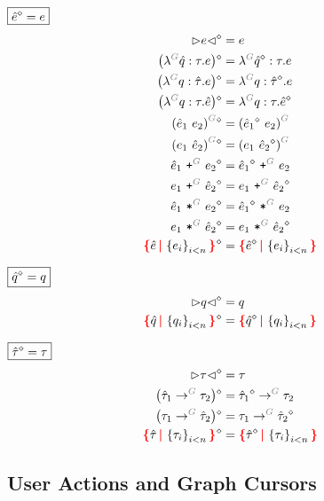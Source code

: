 \noindent $\boxed{\hat{e}\mathclose{}^{\diamond}\mathclose{} = e}$
%
\begin{align*}
  \erase{\cursor{e}} &= e \\
  \erase{\left(\eFun{G}{\Z{q}}{\tau}{e}\right)} &= \eFun{G}{\erase{\Z{q}}}{\tau}{e} \\
  \erase{\left(\eFun{G}{q}{\Z{\tau}}{e}\right)} &= \eFun{G}{q}{\erase{\Z{\tau}}}{e} \\
  \erase{\left(\eFun{G}{q}{\tau}{\Z{e}}\right)} &= \eFun{G}{q}{\tau}{\erase{\Z{e}}} \\
  \erase{\eApp{G}{\Z{e}_1}{e_2}} &= \eApp{G}{\erase{\Z{e}_1}}{e_2} \\
  \erase{\eApp{G}{e_1}{\Z{e}_2}} &= \eApp{G}{e_1}{\erase{\Z{e}_2}} \\
  \erase{\ePlus{G}{\Z{e}_1}{e_2}} &= \ePlus{G}{\erase{\Z{e}_1}}{e_2} \\
  \erase{\ePlus{G}{e_1}{\Z{e}_2}} &= \ePlus{G}{e_1}{\erase{\Z{e}_2}} \\
  \erase{\eTimes{G}{\Z{e}_1}{e_2}} &= \eTimes{G}{\erase{\Z{e}_1}}{e_2} \\
  \erase{\eTimes{G}{e_1}{\Z{e}_2}} &= \eTimes{G}{e_1}{\erase{\Z{e}_2}} \\
  \erase{\conflictHole{\Z{e}, \SetOf{e_i}_{i < n}}} &= \conflictHole{\erase{\Z{e}}, \SetOf{e_i}_{i < n}}
\end{align*}

\noindent $\boxed{\hat{q}\mathclose{}^{\diamond}\mathclose{} = q}$
%
\begin{align*}
  \erase{\cursor{q}} &= q \\
  \erase{\conflictHole{\Z{q}, \SetOf{q_i}_{i < n}}} &= \conflictHole{\erase{\Z{q}}, \SetOf{q_i}_{i < n}}
\end{align*}

\noindent $\boxed{\hat{\tau}\mathclose{}^{\diamond}\mathclose{} = \tau}$
%
\begin{align*}
  \erase{\cursor{\tau}} &= \tau \\
  \erase{\left(\tArrow{G}{\Z{\tau}_1}{\tau_2}\right)} &= \tArrow{G}{\erase{\Z{\tau}_1}}{\tau_2} \\
  \erase{\left(\tArrow{G}{\tau_1}{\Z{\tau}_2}\right)} &= \tArrow{G}{\tau_1}{\erase{\Z{\tau}_2}} \\
  \erase{\conflictHole{\Z{\tau}, \SetOf{\tau_i}_{i < n}}} &= \conflictHole{\erase{\Z{\tau}}, \SetOf{\tau_i}_{i < n}}
\end{align*}


\subsection{User Actions and Graph Cursors}

